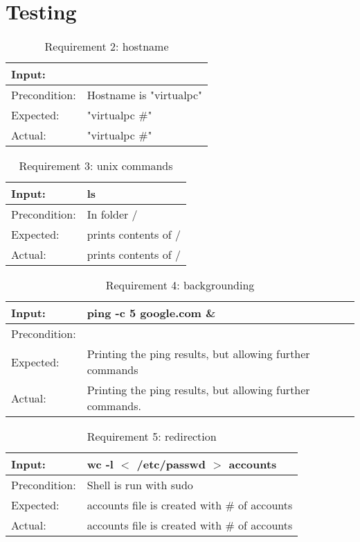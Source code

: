 \chapter{Testing}


\newcommand{\tblrow}[4]{
\hline
\rowcolor{Gray1}
Input: & #1\\ \hline
\rowcolor{Gray1}
Precondition: & #2\\
\hline \hline
Expected: & #3\\
\hline
Actual: & #4\\
\hline \hline
}


\begin{table}
\caption{Requirement 2: hostname}
\centering
\begin{tabular}{|p{} p{}|} \hline

\tblrow{}{Hostname is "virtualpc"}{"virtualpc \#"}{"virtualpc \#"}

\end{tabular}
\label{table:nonlin}
\end{table}

\begin{table}
\caption{Requirement 3: unix commands}
\centering
\begin{tabular}{|p{} p{}|} \hline

\tblrow{ls}{In folder /}{prints contents of /}{prints contents of /}

\end{tabular}
\label{table:nonlin}
\end{table}

\begin{table}
\caption{Requirement 4: backgrounding}
\centering
\begin{tabular}{|p{} p{}|} \hline

\tblrow{ping -c 5 google.com \&}{}{Printing the ping results, but allowing further commands}{Printing the ping results, but allowing further commands.}

\end{tabular}
\label{table:nonlin}
\end{table}

\begin{table}
\caption{Requirement 5: redirection}
\centering
\begin{tabular}{|p{} p{}|} \hline

\tblrow{wc -l  $<$ /etc/passwd $>$ accounts}{Shell is run with sudo}{accounts file is created with \# of accounts}{accounts file is created with \# of accounts}


\end{tabular}
\label{table:nonlin}
\end{table}

